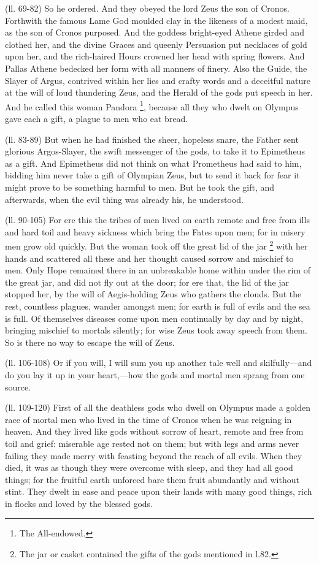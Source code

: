 (ll. 69-82) So he ordered. And they obeyed the lord Zeus the son of Cronos.
Forthwith the famous Lame God moulded clay in the likeness of a modest maid, as
the son of Cronos purposed. And the goddess bright-eyed Athene girded and
clothed her, and the divine Graces and queenly Persuasion put necklaces of gold
upon her, and the rich-haired Hours crowned her head with spring flowers. And
Pallas Athene bedecked her form with all manners of finery. Also the Guide, the
Slayer of Argus, contrived within her lies and crafty words and a deceitful
nature at the will of loud thundering Zeus, and the Herald of the gods put
speech in her. And he called this woman Pandora \footnote{The All-endowed.}, because
all they who dwelt on Olympus gave each a gift, a plague to men who eat bread.

(ll. 83-89) But when he had finished the sheer, hopeless snare, the Father sent
glorious Argos-Slayer, the swift messenger of the gods, to take it to
Epimetheus as a gift. And Epimetheus did not think on what Prometheus had said
to him, bidding him never take a gift of Olympian Zeus, but to send it back for
fear it might prove to be something harmful to men. But he took the gift, and
afterwards, when the evil thing was already his, he understood.

(ll. 90-105) For ere this the tribes of men lived on earth remote and free from
ills and hard toil and heavy sickness which bring the Fates upon men; for in
misery men grow old quickly. But the woman took off the great lid of the jar \footnote{The jar or casket
contained the gifts of the gods mentioned in l.82.} with her hands and scattered all
these and her thought caused sorrow and mischief to men. Only Hope remained
there in an unbreakable home within under the rim of the great jar, and did not
fly out at the door; for ere that, the lid of the jar stopped her, by the will
of Aegis-holding Zeus who gathers the clouds. But the rest, countless plagues,
wander amongst men; for earth is full of evils and the sea is full. Of
themselves diseases come upon men continually by day and by night, bringing
mischief to mortals silently; for wise Zeus took away speech from them. So is
there no way to escape the will of Zeus.

(ll. 106-108) Or if you will, I will sum you up another tale well and
skilfully—and do you lay it up in your heart,—how the gods and
mortal men sprang from one source.

(ll. 109-120) First of all the deathless gods who dwell on Olympus made a
golden race of mortal men who lived in the time of Cronos when he was reigning
in heaven. And they lived like gods without sorrow of heart, remote and free
from toil and grief: miserable age rested not on them; but with legs and arms
never failing they made merry with feasting beyond the reach of all evils. When
they died, it was as though they were overcome with sleep, and they had all
good things; for the fruitful earth unforced bare them fruit abundantly and
without stint. They dwelt in ease and peace upon their lands with many good
things, rich in flocks and loved by the blessed gods.

